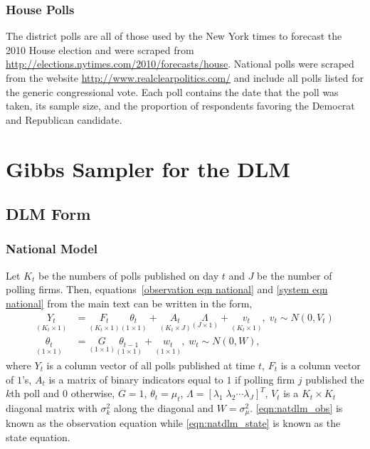 \documentclass[12pt,final,fleqn]{article}
\theoremstyle{plain}
\begin{document}
\subsubsection{House Polls}
The district polls are all of those used by the New York times to forecast the 2010 House election and  were scraped from \url{http://elections.nytimes.com/2010/forecasts/house}. National polls were scraped from the website \url{http://www.realclearpolitics.com/} and include all polls listed for the generic congressional vote. Each poll contains the date that the poll was taken, its sample size, and the proportion of respondents favoring the Democrat and Republican candidate. 

\section{Gibbs Sampler for the DLM} \label{sec:gibbs}
\subsection{DLM Form} \label{sec: DLM Form}
\subsubsection{National Model} 
Let $K_t$ be the numbers of polls published on day $t$ and $J$ be the number of polling firms. Then, equations~\ref{observation eqn national} and \ref{system eqn national} from the main text can be written in the form,
\begin{align}
\label{eqn:natdlm_obs}
\underset{(K_t \times 1)}{Y_t} &= \underset{(K_t \times 1)}{F_t} \underset{(1 \times 1)}{\theta_t} + \underset{(K_t \times J)}{A_t} \underset{(J \times 1)}{\Lambda} + \underset{(K_t \times 1)}{v_t},\; v_t \sim N(0, V_t)\\
\label{eqn:natdlm_state}
\underset{(1 \times 1)}{\theta_t} &= \underset{(1 \times 1)}{G}\underset{(1 \times 1)}{\theta_{t-1}} + \underset{(1 \times 1)}{w_t},\; w_t \sim N(0, W),
\end{align}
where $Y_t$ is a column vector of all polls published at time $t$, $F_t$ is a column vector of $1$'s, $A_t$ is a matrix of binary indicators equal to $1$ if polling firm $j$ published the $k$th poll and $0$ otherwise, $G=1$, $\theta_t = \mu_t$, $\Lambda =[\lambda_1\; \lambda_2\cdots \lambda_J]^T$,  $V_t$ is a $K_t \times K_t$ diagonal matrix with $\sigma^2_k$ along the diagonal and $W=\sigma^2_\mu$. \autoref{eqn:natdlm_obs} is known as the observation equation while \autoref{eqn:natdlm_state} is known as the state equation. 
\end{document}
